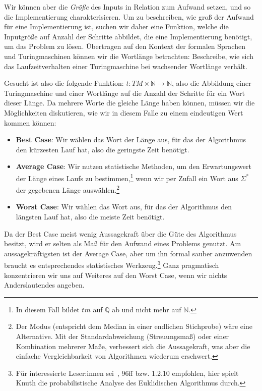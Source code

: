 Wir können aber die \emph{Größe} des Inputs in Relation zum Aufwand setzen,
und so die Implementierung charakterisieren.
Um zu beschreiben,
wie groß der Aufwand für eine Implementierung ist,
suchen wir daher eine Funktion,
welche die Inputgröße auf Anzahl der Schritte abbildet,
die eine Implementierung benötigt,
um das Problem zu lösen.
Übertragen auf den Kontext der formalen Sprachen und Turingmaschinen
können wir die Wortlänge betrachten:
Beschreibe, wie sich das Laufzeitverhalten einer Turingmaschine
bei wachsender Wortlänge verhält.

Gesucht ist also die folgende Funktion:
$t: TM \times{} \mathbb{N} \rightarrow{} \mathbb{N}$,
also die Abbildung einer Turingmaschine und einer Wortlänge
auf die Anzahl der Schritte für ein Wort dieser Länge.
Da mehrere Worte die gleiche Länge haben können,
müssen wir die Möglichkeiten diskutieren,
wie wir in diesem Falle zu einem eindeutigen Wert kommen können:
\begin{itemize}
    \item \textbf{Best Case}: Wir wählen das Wort der Länge aus,
        für das der Algorithmus den kürzesten Lauf hat,
        also die geringste Zeit benötigt.
    \item \textbf{Average Case}: Wir nutzen statistische Methoden,
        um den Erwartungswert der Länge eines Laufs zu bestimmen,\footnote{%
            In diesem Fall bildet $tm$ auf $\mathbb{Q}$ ab und nicht mehr auf $\mathbb{N}$.}
        wenn wir per Zufall ein Wort aus $\Sigma^*$ der gegebenen Länge auswählen.\footnote{%
            Der Modus (entspricht dem Median in einer endlichen Stichprobe) wäre eine Alternative.
        Mit der Standardabweichung (Streuungsmaß) oder einer Kombination mehrerer Maße,
        verbessert sich die Aussagekraft,
        was aber die einfache Vergleichbarkeit von Algorithmen wiederum erschwert.}
    \item \textbf{Worst Case}: Wir wählen das Wort aus,
        für das der Algorithmus den längsten Lauf hat,
        also die meiste Zeit benötigt.
\end{itemize}

Da der Best Case meist wenig Aussagekraft über die Güte des Algorithmus besitzt,
wird er selten als Maß für den Aufwand eines Problems genutzt.
Am aussagekräftigsten ist der Average Case,
aber um ihn formal sauber anzuwenden braucht es
entsprechendes statistisches Werkzeug.\footnote{%
    Für interessierte Leser:innen sei~\cite{knuth1}, 96ff bzw. 1.2.10 empfohlen,
    hier spielt Knuth die probabilistische Analyse des Euklidischen Algorithmus durch.}
Ganz pragmatisch konzentrieren wir uns auf Weiteres auf den Worst Case,
wenn wir nichts Anderslautendes angeben.


